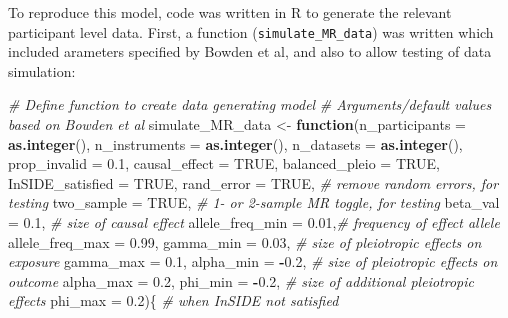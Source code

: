 \documentclass[
]{article}
\newenvironment{Shaded}{\begin{snugshade}}{\end{snugshade}}
\newcommand{\AttributeTok}[1]{\textcolor[rgb]{0.13,0.29,0.53}{#1}}
\newcommand{\CommentTok}[1]{\textcolor[rgb]{0.56,0.35,0.01}{\textit{#1}}}
\newcommand{\ConstantTok}[1]{\textcolor[rgb]{0.56,0.35,0.01}{#1}}
\newcommand{\ControlFlowTok}[1]{\textcolor[rgb]{0.13,0.29,0.53}{\textbf{#1}}}
\newcommand{\FloatTok}[1]{\textcolor[rgb]{0.00,0.00,0.81}{#1}}
\newcommand{\FunctionTok}[1]{\textcolor[rgb]{0.13,0.29,0.53}{\textbf{#1}}}
\newcommand{\NormalTok}[1]{#1}
\newcommand{\OtherTok}[1]{\textcolor[rgb]{0.56,0.35,0.01}{#1}}
\newcommand{\SpecialCharTok}[1]{\textcolor[rgb]{0.81,0.36,0.00}{\textbf{#1}}}
\begin{document}
To reproduce this model, code was written in R to generate the relevant participant level data. First, a function (\texttt{simulate\_MR\_data}) was written which included arameters specified by Bowden et al, and also to allow testing of data simulation:

\begin{Shaded}
\begin{Highlighting}[]
\CommentTok{\# Define function to create data generating model}
\CommentTok{\# Arguments/default values based on Bowden et al}
\NormalTok{ simulate\_MR\_data }\OtherTok{\textless{}{-}} \ControlFlowTok{function}\NormalTok{(}\AttributeTok{n\_participants =} \FunctionTok{as.integer}\NormalTok{(),}
                              \AttributeTok{n\_instruments =} \FunctionTok{as.integer}\NormalTok{(),}
                              \AttributeTok{n\_datasets =} \FunctionTok{as.integer}\NormalTok{(),}
                              \AttributeTok{prop\_invalid =} \FloatTok{0.1}\NormalTok{,}
                              \AttributeTok{causal\_effect =} \ConstantTok{TRUE}\NormalTok{,}
                              \AttributeTok{balanced\_pleio =} \ConstantTok{TRUE}\NormalTok{,}
                              \AttributeTok{InSIDE\_satisfied =} \ConstantTok{TRUE}\NormalTok{,}
                              \AttributeTok{rand\_error =} \ConstantTok{TRUE}\NormalTok{,     }\CommentTok{\# remove random errors, for testing}
                              \AttributeTok{two\_sample =} \ConstantTok{TRUE}\NormalTok{,     }\CommentTok{\# 1{-} or 2{-}sample MR toggle, for testing}
                              \AttributeTok{beta\_val =} \FloatTok{0.1}\NormalTok{,        }\CommentTok{\# size of causal effect}
                              \AttributeTok{allele\_freq\_min =} \FloatTok{0.01}\NormalTok{,}\CommentTok{\# frequency of effect allele}
                              \AttributeTok{allele\_freq\_max =} \FloatTok{0.99}\NormalTok{,}
                              \AttributeTok{gamma\_min =} \FloatTok{0.03}\NormalTok{,      }\CommentTok{\# size of pleiotropic effects on exposure}
                              \AttributeTok{gamma\_max =} \FloatTok{0.1}\NormalTok{,}
                              \AttributeTok{alpha\_min =} \SpecialCharTok{{-}}\FloatTok{0.2}\NormalTok{,      }\CommentTok{\# size of pleiotropic effects on outcome}
                              \AttributeTok{alpha\_max =} \FloatTok{0.2}\NormalTok{,}
                              \AttributeTok{phi\_min =} \SpecialCharTok{{-}}\FloatTok{0.2}\NormalTok{,        }\CommentTok{\# size of additional pleiotropic effects}
                              \AttributeTok{phi\_max =} \FloatTok{0.2}\NormalTok{)\{        }\CommentTok{\# when InSIDE not satisfied}




\end{Highlighting}
\end{Shaded}
\end{document}
